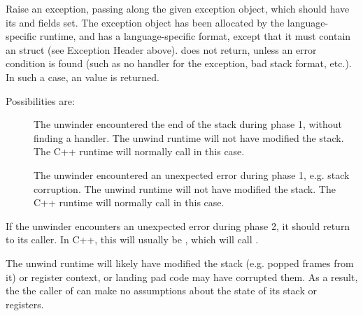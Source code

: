 Raise an exception, passing along the given exception object,
which should have its  and  fields
set. The exception object has been allocated by the language-specific
runtime, and has a language-specific format, except that it must
contain an  struct (see Exception Header above).
 does not return, unless an error condition is
found (such as no handler for the exception, bad stack format, etc.).
In such a case, an  value is returned.

Possibilities are:
\begin{description}
\item[] The unwinder encountered the end of the
   stack during phase 1, without finding a handler. The unwind runtime
   will not have modified the stack. The C++ runtime will normally call
    in this case.
\item[] The unwinder encountered an unexpected
   error during phase 1, e.g. stack corruption. The unwind runtime will
   not have modified the stack. The C++ runtime will normally call
    in this case.
\end{description}

If the unwinder encounters an unexpected error during phase 2, it
should return  to its caller.  In
C++, this will usually be , which will call
.

The unwind runtime will likely have modified the stack (e.g. popped
frames from it) or register context, or landing pad code may have
corrupted them. As a result, the the caller of 
can make no assumptions about the state of its stack or registers.

\subsubsection{}


